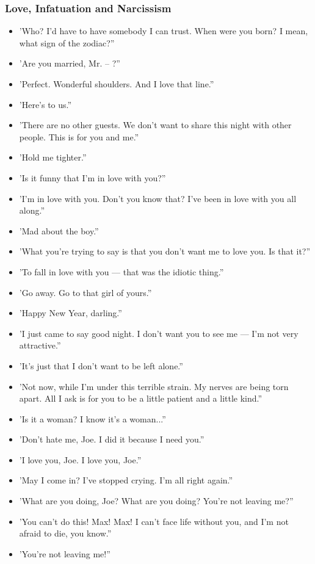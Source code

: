 \documentclass[a4paper]{article}
\begin{document}
\subsubsection{Love, Infatuation and Narcissism}
\begin{itemize}
\item 'Who? I'd have to have somebody I can trust. When were you born? I mean, what sign of the zodiac?”
\item 'Are you married, Mr. -- ?”
\item 'Perfect. Wonderful shoulders. And I love that line.”
\item 'Here's to us.”
\item 'There are no other guests. We don't want to share this night with other people. This is for you and me.”
\item 'Hold me tighter.”
\item 'Is it funny that I'm in love with you?”
\item 'I'm in love with you. Don't you know that? I've been in love with you all along.”
\item 'Mad about the boy.”
\item 'What you're trying to say is that you don't want me to love you. Is that it?”
\item 'To fall in love with you — that was the idiotic thing.”
\item 'Go away. Go to that girl of yours.”
\item 'Happy New Year, darling.”
\item 'I just came to say good night. I don't want you to see me — I'm not very attractive.”
\item 'It's just that I don't want to be left alone.”
\item 'Not now, while I'm under this terrible strain. My nerves are being torn apart. All I ask is for you to be a little patient and a little kind.”
\item 'Is it a woman? I know it's a woman...”
\item 'Don't hate me, Joe. I did it because I need you.”
\item 'I love you, Joe. I love you, Joe.”
\item 'May I come in? I've stopped crying. I'm all right again.”
\item 'What are you doing, Joe? What are you doing? You're not leaving me?”
\item 'You can't do this! Max! Max! I can't face life without you, and I'm not afraid to die, you know.”
\item 'You're not leaving me!”
\end{itemize}
\end{document}
